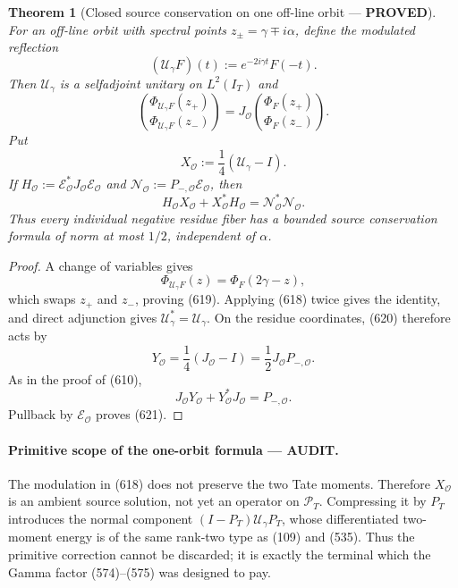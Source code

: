 \documentclass[11pt]{article}
\newtheorem{theorem}{Theorem}
\newcommand{\PROVED}{\textcolor{green!45!black}{\textbf{PROVED}}}
\newcommand{\AUDIT}{\textcolor{orange!75!black}{\textbf{AUDIT}}}
\begin{document}
\begin{theorem}[Closed source conservation on one off-line orbit ---
\PROVED]
For an off-line orbit with spectral points
\(z_\pm=\gamma\mp i\alpha\), define the modulated reflection
\begin{equation}
 (\mathcal U_\gamma F)(t):=e^{-2i\gamma t}F(-t).
                                                               \tag{618}
\end{equation}
Then \(\mathcal U_\gamma\) is a selfadjoint unitary on \(L^2(I_T)\) and
\begin{equation}
 \binom{\Phi_{\mathcal U_\gamma F}(z_+)}
       {\Phi_{\mathcal U_\gamma F}(z_-)}
 =J_{\mathcal O}
  \binom{\Phi_F(z_+)}{\Phi_F(z_-)}.                  \tag{619}
\end{equation}
Put
\begin{equation}
 X_{\mathcal O}:=\frac14(\mathcal U_\gamma-I).        \tag{620}
\end{equation}
If
\(H_{\mathcal O}:=
 \mathcal E_{\mathcal O}^*J_{\mathcal O}
 \mathcal E_{\mathcal O}\) and
\(\mathcal N_{\mathcal O}:=P_{-,\mathcal O}
 \mathcal E_{\mathcal O}\), then
\begin{equation}
 \boxed{
 H_{\mathcal O}X_{\mathcal O}
 +X_{\mathcal O}^*H_{\mathcal O}
 =\mathcal N_{\mathcal O}^*\mathcal N_{\mathcal O}.} \tag{621}
\end{equation}
Thus every individual negative residue fiber has a bounded source
conservation formula of norm at most \(1/2\), independent of \(\alpha\).
\end{theorem}

\begin{proof}
A change of variables gives
\[
 \Phi_{\mathcal U_\gamma F}(z)
 =\Phi_F(2\gamma-z),
\]
which swaps \(z_+\) and \(z_-\), proving (619).  Applying (618) twice gives
the identity, and direct adjunction gives
\(\mathcal U_\gamma^*=\mathcal U_\gamma\).
On the residue coordinates, (620) therefore acts by
\[
 Y_{\mathcal O}=\frac14(J_{\mathcal O}-I)
 =\frac12J_{\mathcal O}P_{-,\mathcal O}.
\]
As in the proof of (610),
\[
 J_{\mathcal O}Y_{\mathcal O}
 +Y_{\mathcal O}^*J_{\mathcal O}=P_{-,\mathcal O}.
\]
Pullback by \(\mathcal E_{\mathcal O}\) proves (621).
\end{proof}

\paragraph{Primitive scope of the one-orbit formula --- \AUDIT.}
The modulation in (618) does not preserve the two Tate moments.  Therefore
\(X_{\mathcal O}\) is an ambient source solution, not yet an operator on
\(\mathcal P_T\).  Compressing it by \(P_T\) introduces the normal component
\((I-P_T)\mathcal U_\gamma P_T\), whose differentiated two-moment energy is
of the same rank-two type as (109) and (535).  Thus the primitive correction
cannot be discarded; it is exactly the terminal which the Gamma factor
(574)--(575) was designed to pay.
\end{document}
